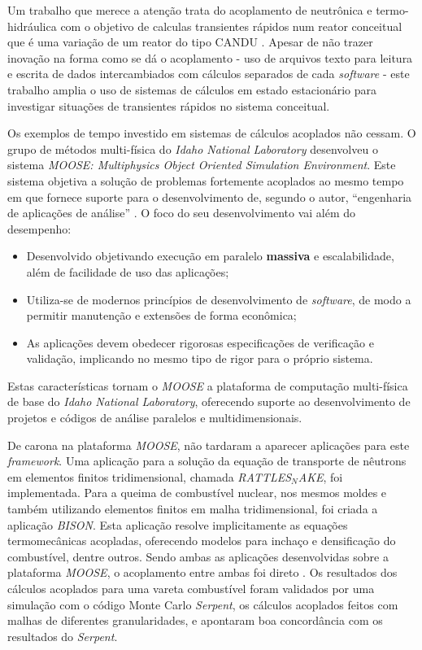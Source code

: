 Um trabalho que merece a atenção trata do acoplamento de neutrônica e termo-hidráulica com o objetivo
de calculas transientes rápidos num reator conceitual que é uma variação de um reator do tipo CANDU
\cite{Hummel2016}. Apesar de não trazer inovação na forma como se dá o acoplamento - uso de arquivos
texto para leitura e escrita de dados intercambiados com cálculos separados de cada \textit{software} -
este trabalho amplia o uso de sistemas de cálculos em estado estacionário para investigar situações
de transientes rápidos no sistema conceitual.



Os exemplos de tempo investido em sistemas de cálculos acoplados não cessam. O grupo
de métodos multi-física do \textit{Idaho National Laboratory} desenvolveu o sistema
\textit{MOOSE: Multiphysics Object Oriented Simulation Environment}. Este sistema objetiva
a solução de problemas fortemente acoplados ao mesmo tempo em que fornece suporte para
o desenvolvimento de, segundo o autor, ``engenharia de aplicações de análise''
\cite{Gaston2009}. O foco do seu desenvolvimento vai além do desempenho:
\begin{itemize}
\item Desenvolvido objetivando execução em paralelo \textbf{massiva} e escalabilidade,
  além de facilidade de uso das aplicações;
\item Utiliza-se de modernos princípios de desenvolvimento de \textit{software}, de modo
  a permitir manutenção e extensões de forma econômica;
\item As aplicações devem obedecer rigorosas especificações de verificação e validação,
  implicando no mesmo tipo de rigor para o próprio sistema.
\end{itemize}
Estas características tornam o \textit{MOOSE} a plataforma de computação multi-física
de base do \textit{Idaho National Laboratory}, oferecendo suporte ao desenvolvimento
de projetos e códigos de análise paralelos e multidimensionais.

De carona na plataforma \textit{MOOSE}, não tardaram a aparecer aplicações para
este \textit{framework}. Uma aplicação para a solução da equação de transporte
de nêutrons em elementos finitos tridimensional, chamada \textit{RATTLES$_{N}$AKE},
foi implementada. Para a queima de combustível nuclear, nos mesmos moldes e
também utilizando elementos finitos em malha tridimensional, foi criada a aplicação
\textit{BISON}. Esta aplicação resolve implicitamente as equações termomecânicas
acopladas, oferecendo modelos para inchaço e densificação do combustível, dentre outros.
Sendo ambas as aplicações desenvolvidas sobre a plataforma \textit{MOOSE}, o acoplamento
entre ambas foi direto \cite{Gleicher2014}.
Os resultados dos cálculos acoplados para uma vareta combustível foram validados por uma simulação com o código Monte Carlo \textit{Serpent},
os cálculos acoplados feitos com malhas de diferentes granularidades, e apontaram boa
concordância com os resultados do \textit{Serpent}.

